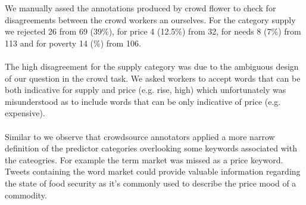 We manually assed the annotations produced by crowd flower to check for disagreements between the crowd workers an ourselves. For the category supply we rejected 26 from 69 (39\%), for price 4 (12.5\%) from 32, for needs 8 (7\%) from 113 and for poverty 14 (\%) from 106. \\
\\
The high disagreement for the supply category was due to the ambiguous design of our question in the crowd task. We asked workers to accept words that can be both indicative for supply and price (e.g. rise, high) which unfortunately was misunderstood as to include words that can be only indicative of price (e.g. expensive). \\
\\
Similar to \cite{olt15} we observe that crowdsource annotators applied a more narrow definition of the predictor categories overlooking some keywords associated with the cateogries. For example the term market was missed as a price keyword. Tweets containing the word market could provide valuable information regarding the state of food security as it's commonly used to describe the price  mood of a commodity. \\
\\



